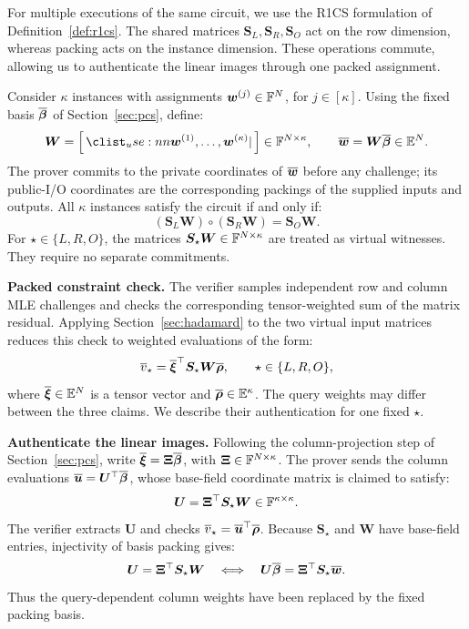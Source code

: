 For multiple executions of the same circuit, we use the R1CS
formulation of Definition~\ref{def:r1cs}.
The shared matrices \(\bm S_L,\bm S_R,\bm S_O\) act on the
row dimension, whereas packing acts on the instance dimension.
These operations commute, allowing us to authenticate the
linear images through one packed assignment.

Consider \(\kappa\) instances with assignments
\(\bm w^{(j)}\in{\mathbb{F}}^N\), for \(j\in[\kappa]\).
Using the fixed basis \(\overline{\bm\beta}\) of
Section~\ref{sec:pcs}, define:
\[
    \bm W
       =\concat{\bm w^{(1)},\ldots,\bm w^{(\kappa)}}
       \in\Field^{N\times\kappa},
    \qquad
    \ext{\bm w}=\bm W\ext{\bm\beta}\in\ExtensionField^N.
\]
The prover commits to the private coordinates of
\(\overline{\bm w}\) before any challenge; its public-I/O coordinates
are the corresponding packings of the supplied inputs and outputs.
All \(\kappa\) instances satisfy the circuit if and only if:
\[
    (\bm S_L\bm W)\circ(\bm S_R\bm W)=\bm S_O\bm W.
\]
For \(\star\in\{L,R,O\}\), the matrices
\(\bm S_\star\bm W\in{\mathbb{F}}^{N\times\kappa}\) are treated as
virtual witnesses. They require no separate commitments.

\smallskip\noindent\textbf{Packed constraint check.}
The verifier samples independent row and column MLE challenges
and checks the corresponding tensor-weighted sum of the matrix
residual. Applying Section~\ref{sec:hadamard} to the two virtual
input matrices reduces this check to weighted evaluations of
the form:
\[
    \overline{v}_\star
       =\overline{\bm\xi}^{\top}
          \bm S_\star\bm W\overline{\bm\rho},
    \qquad
    \star\in\{L,R,O\},
\]
where \(\overline{\bm\xi}\in\mathbb{E}^N\) is a tensor vector
and \(\overline{\bm\rho}\in\mathbb{E}^\kappa\).
The query weights may differ between the three claims.
We describe their authentication for one fixed \(\star\).

\smallskip\noindent\textbf{Authenticate the linear images.}
Following the column-projection step of Section~\ref{sec:pcs},
write \(\overline{\bm\xi}=\bm\Xi\overline{\bm\beta}\), with
\(\bm\Xi\in{\mathbb{F}}^{N\times\kappa}\).
The prover sends the column evaluations
\(\overline{\bm u}=\bm U^\top\overline{\bm\beta}\), whose base-field
coordinate matrix is claimed to satisfy:
\[
    \bm U=\bm\Xi^\top\bm S_\star\bm W
       \in{\mathbb{F}}^{\kappa\times\kappa}.
\]
The verifier extracts \(\bm U\) and checks
\(\overline{v}_\star=\overline{\bm u}^{\top}\overline{\bm\rho}\).
Because \(\bm S_\star\) and \(\bm W\) have base-field entries,
injectivity of basis packing gives:
\[
    \bm U=\bm\Xi^\top\bm S_\star\bm W
    \quad\Longleftrightarrow\quad
    \bm U\overline{\bm\beta}
       =\bm\Xi^\top\bm S_\star\overline{\bm w}.
\]
Thus the query-dependent column weights have been replaced
by the fixed packing basis.

